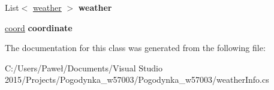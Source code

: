 \begin{DoxyCompactItemize}
\item 
\mbox{\label{class_pogodynka__w57003_1_1_weather_info_1_1_root_a190f5bef130c1534292fd2d6f1011ecb}} 
List$<$ \mbox{\hyperlink{class_pogodynka__w57003_1_1_weather_info_1_1weather}{weather}} $>$ {\bfseries weather}
\item 
\mbox{\label{class_pogodynka__w57003_1_1_weather_info_1_1_root_ad81df4d32e660bf1c4915c0c0e22eb85}} 
\mbox{\hyperlink{class_pogodynka__w57003_1_1_weather_info_1_1coord}{coord}} {\bfseries coordinate}
\end{DoxyCompactItemize}


The documentation for this class was generated from the following file\+:\begin{DoxyCompactItemize}
\item 
C\+:/\+Users/\+Paweł/\+Documents/\+Visual Studio 2015/\+Projects/\+Pogodynka\+\_\+w57003/\+Pogodynka\+\_\+w57003/weather\+Info.\+cs\end{DoxyCompactItemize}

